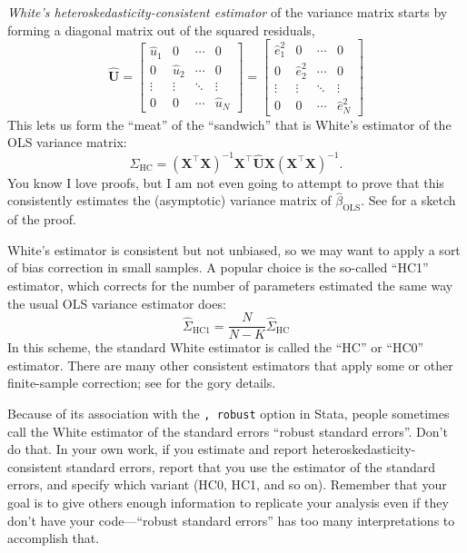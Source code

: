 \documentclass[12pt,oneside,openany]{book}
\begin{document}
\emph{White's heteroskedasticity-consistent estimator}
\citep{white1980heteroskedasticity} of the variance matrix starts by
forming a diagonal matrix out of the squared residuals, \[
\hat{\mathbf{U}}
=
\begin{bmatrix}
\hat{u}_1 & 0 & \cdots & 0 \\
0 & \hat{u}_2 & \cdots & 0 \\
\vdots & \vdots & \ddots & \vdots \\
0 & 0 & \cdots & \hat{u}_N
\end{bmatrix}
=
\begin{bmatrix}
\hat{e}_1^2 & 0 & \cdots & 0 \\
0 & \hat{e}_2^2 & \cdots & 0 \\
\vdots & \vdots & \ddots & \vdots \\
0 & 0 & \cdots & \hat{e}_N^2
\end{bmatrix}
\] This lets us form the ``meat'' of the ``sandwich'' that is White's
estimator of the OLS variance matrix: \[
\hat{\Sigma}_{\text{HC}}
=
(\mathbf{X}^\top \mathbf{X})^{-1} \mathbf{X}^\top \hat{\mathbf{U}} \mathbf{X} (\mathbf{X}^\top \mathbf{X})^{-1}.
\] You know I love proofs, but I am not even going to attempt to prove
that this consistently estimates the (asymptotic) variance matrix of
\(\hat{\beta}_{\text{OLS}}\). See \citet[pp.~198--199]{greene} for a
sketch of the proof.

White's estimator is consistent but not unbiased, so we may want to
apply a sort of bias correction in small samples. A popular choice is
the so-called ``HC1'' estimator, which corrects for the number of
parameters estimated the same way the usual OLS variance estimator does:
\[
\hat{\Sigma}_{\text{HC1}} = \frac{N}{N - K} \hat{\Sigma}_{\text{HC}}
\] In this scheme, the standard White estimator is called the ``HC'' or
``HC0'' estimator. There are many other consistent estimators that apply
some or other finite-sample correction; see \citet{mackinnon1985some}
for the gory details.

Because of its association with the \texttt{,\ robust} option in Stata,
people sometimes call the White estimator of the standard errors
``robust standard errors''. Don't do that. In your own work, if you
estimate and report heteroskedasticity-consistent standard errors,
report that you use the \citet{white1980heteroskedasticity} estimator of
the standard errors, and specify which variant (HC0, HC1, and so on).
Remember that your goal is to give others enough information to
replicate your analysis even if they don't have your code---``robust
standard errors'' has too many interpretations to accomplish that.
\end{document}
